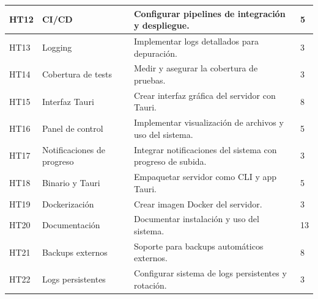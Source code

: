 \begin{tabularx}{\textwidth}{|l|l|>{\raggedright\arraybackslash}X|l|}
    \hline
    HT12 & CI/CD & Configurar pipelines de integración y despliegue. & 5 \\
    \hline
    HT13 & Logging & Implementar logs detallados para depuración. & 3 \\
    \hline
    HT14 & Cobertura de tests & Medir y asegurar la cobertura de pruebas. & 3 \\
    \hline
    HT15 & Interfaz Tauri & Crear interfaz gráfica del servidor con Tauri. & 8 \\
    \hline
    HT16 & Panel de control & Implementar visualización de archivos y uso del sistema. & 5 \\
    \hline
    HT17 & Notificaciones de progreso & Integrar notificaciones del sistema con progreso de subida. & 3 \\
    \hline
    HT18 & Binario y Tauri & Empaquetar servidor como CLI y app Tauri. & 5 \\
    \hline
    HT19 & Dockerización & Crear imagen Docker del servidor. & 3 \\
    \hline
    HT20 & Documentación & Documentar instalación y uso del sistema. & 13 \\
    \hline
    HT21 & Backups externos & Soporte para backups automáticos externos. & 8 \\
    \hline
    HT22 & Logs persistentes & Configurar sistema de logs persistentes y rotación. & 3 \\
    \hline
\end{tabularx}

\newpage
